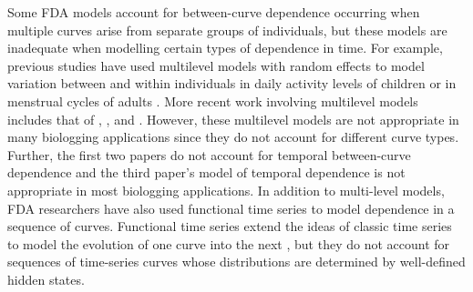 
Some FDA models account for between-curve dependence occurring when multiple curves arise from separate groups of individuals, but these models are inadequate when modelling certain types of dependence in time. For example, previous studies have used multilevel models with random effects to model variation between and within individuals in daily activity levels of children \citep{Morris:2007} or in menstrual cycles of adults \citep{Bromback:1998}. More recent work involving multilevel models includes that of \citet{Di:2009}, \citet{Crainiceanu:2009}, and \citet{Chen:2012}. However, these multilevel models are not appropriate in many biologging applications since they do not account for different curve types. Further, the first two papers do not account for temporal between-curve dependence and the third paper's model of temporal dependence is not appropriate in most biologging applications. 
In addition to multi-level models, FDA researchers have also used functional time series to model dependence in a sequence of curves. Functional time series extend the ideas of classic time series to model the evolution of one curve into the next \citep{Kokoszka:2018}, but they do not account for sequences of time-series curves whose distributions are determined by well-defined hidden states.

